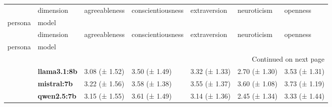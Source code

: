 \begin{longtable}{lllllll}
\toprule
 & dimension & agreeableness & conscientiousness & extraversion & neuroticism & openness \\
persona & model &  &  &  &  &  \\
\midrule
\endfirsthead
\toprule
 & dimension & agreeableness & conscientiousness & extraversion & neuroticism & openness \\
persona & model &  &  &  &  &  \\
\midrule
\endhead
\midrule
\multicolumn{7}{r}{Continued on next page} \\
\midrule
\endfoot
\bottomrule
\endlastfoot
\multirow[t]{3}{*}{\textbf{base}} & \textbf{llama3.1:8b} & 3.08 (± 1.52) & 3.50 (± 1.49) & 3.32 (± 1.33) & 2.70 (± 1.30) & 3.53 (± 1.31) \\
\textbf{} & \textbf{mistral:7b} & 3.22 (± 1.56) & 3.58 (± 1.38) & 3.55 (± 1.37) & 3.60 (± 1.08) & 3.73 (± 1.19) \\
\textbf{} & \textbf{qwen2.5:7b} & 3.15 (± 1.55) & 3.61 (± 1.49) & 3.14 (± 1.36) & 2.45 (± 1.34) & 3.33 (± 1.44) \\
\cline{1-7}
\end{longtable}
